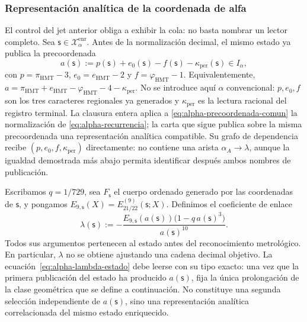 \subsubsection{Representación analítica de la coordenada de alfa}
\label{subsec:alpha-lector-completo-rev08}

El control del jet anterior obliga a exhibir la cola: no basta nombrar un
lector completo. Sea \(\mathsf s\in\mathcal X_\alpha^{\mathrm{enr}}\). Antes
de la normalización decimal, el mismo estado ya publica la precoordenada
\begin{equation}
 a(\mathsf s):=p(\mathsf s)+e_0(\mathsf s)-f(\mathsf s)
                 -\kappa_{\mathrm{per}}(\mathsf s)\in I_\alpha,
 \label{eq:alpha-precoordenada-comun}
\end{equation}
con \(p=\pi_{\mathrm{HMT}}-3\),
\(e_0=e_{\mathrm{HMT}}-2\) y
\(f=\varphi_{\mathrm{HMT}}-1\). Equivalentemente,
\(a=\pi_{\mathrm{HMT}}+e_{\mathrm{HMT}}-
\varphi_{\mathrm{HMT}}-4-\kappa_{\mathrm{per}}\). No se introduce aquí
\(\alpha\) convencional: \(p,e_0,f\) son los tres caracteres regionales ya
generados y \(\kappa_{\mathrm{per}}\) es la lectura racional del registro
terminal. La clausura entera aplica a
\eqref{eq:alpha-precoordenada-comun} la normalización de
\eqref{eq:alpha-recurrencia}; la carta que sigue publica sobre la misma
precoordenada una representación analítica compatible. Su grafo de
dependencia recibe \((p,e_0,f,\kappa_{\mathrm{per}})\) directamente: no
contiene una arista \(\alpha_A\to\lambda\), aunque la igualdad demostrada más
abajo permita identificar después ambos nombres de publicación.

Escribamos \(q=1/729\), sea \(F_{\mathsf s}\) el cuerpo ordenado generado por
las coordenadas de \(\mathsf s\), y pongamos
\(E_{9,\mathsf s}(X)=E_{21/22}^{(9)}(\mathsf s;X)\). Definimos el coeficiente
de enlace
\begin{equation}
 \lambda(\mathsf s):=
 -\frac{E_{9,\mathsf s}(a(\mathsf s))
         \bigl(1-q\,a(\mathsf s)^3\bigr)}{a(\mathsf s)^{10}}.
 \label{eq:alpha-lambda-estado}
\end{equation}
Todos sus argumentos pertenecen al estado antes del reconocimiento
metrológico. En particular, \(\lambda\) no se obtiene ajustando una cadena
decimal objetivo. La ecuación~\eqref{eq:alpha-lambda-estado} debe leerse con
su tipo exacto: una vez que la primera publicación del estado ha producido
\(a(\mathsf s)\), fija la única prolongación de la clase geométrica que se
define a continuación. No constituye una segunda selección independiente de
\(a(\mathsf s)\), sino una representación analítica correlacionada del mismo
estado enriquecido.

